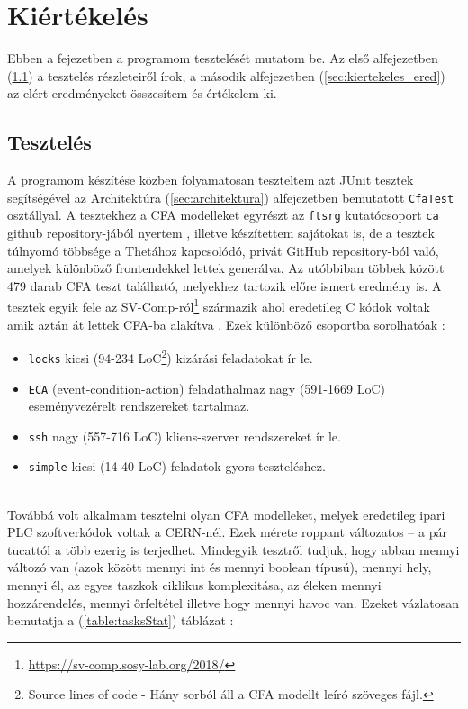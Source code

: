 \chapter{Kiértékelés}
\label{sec:kiertekeles}

Ebben a fejezetben a programom tesztelését mutatom be. Az első alfejezetben (\ref{sec:kiertekeles_teszt}) a tesztelés részleteiről írok, a második alfejezetben (\ref{sec:kiertekeles_ered}) az elért eredményeket összesítem és értékelem ki.

\section{Tesztelés}
\label{sec:kiertekeles_teszt}
A programom készítése közben folyamatosan teszteltem azt JUnit tesztek segítségével az Architektúra (\ref{sec:architektura}) alfejezetben bemutatott \texttt{CfaTest} osztállyal. A tesztekhez a CFA modelleket egyrészt az \texttt{ftsrg} kutatócsoport \texttt{ca} github repository-jából nyertem \cite{ca-lab-tests}, illetve készítettem sajátokat is, de a tesztek túlnyomó többsége a Thetához kapcsolódó, privát GitHub repository-ból való, amelyek különböző frontendekkel lettek generálva. Az utóbbiban többek között 479 darab CFA teszt található, melyekhez tartozik előre ismert eredmény is. A tesztek egyik fele az SV-Comp-ról\footnote{\url{https://sv-comp.sosy-lab.org/2018/}} származik ahol eredetileg C kódok voltak amik aztán át lettek CFA-ba alakítva \cite{vpt2017}. Ezek különböző csoportba sorolhatóak \cite{akos-phd}:

\begin{itemize}
	\label{felsorolas}
	
	\item \texttt{locks} kicsi (94-234 LoC\footnote{Source lines of code - Hány sorból áll a CFA modellt leíró szöveges fájl.}) kizárási feladatokat ír le.
	
	\item \texttt{ECA} (event-condition-action) feladathalmaz nagy (591-1669 LoC) eseményvezérelt rendszereket tartalmaz.
	
	\item \texttt{ssh} nagy (557-716 LoC) kliens-szerver rendszereket ír le.
	
	\item \texttt{simple} kicsi (14-40 LoC) feladatok gyors teszteléshez.
\end{itemize}
\ \\
Továbbá volt alkalmam tesztelni olyan CFA modelleket, melyek eredetileg ipari PLC szoftverkódok voltak a CERN-nél. \cite{darvas2019plcverif} Ezek mérete roppant változatos -- a pár tucattól a több ezerig is terjedhet. Mindegyik tesztről tudjuk, hogy abban mennyi változó van (azok között mennyi int és mennyi boolean típusú), mennyi hely, mennyi él, az egyes taszkok ciklikus komplexitása, az éleken mennyi hozzárendelés, mennyi őrfeltétel illetve hogy mennyi havoc van. Ezeket vázlatosan bemutatja a (\ref{table:tasksStat}) táblázat \cite{akos-phd}:

